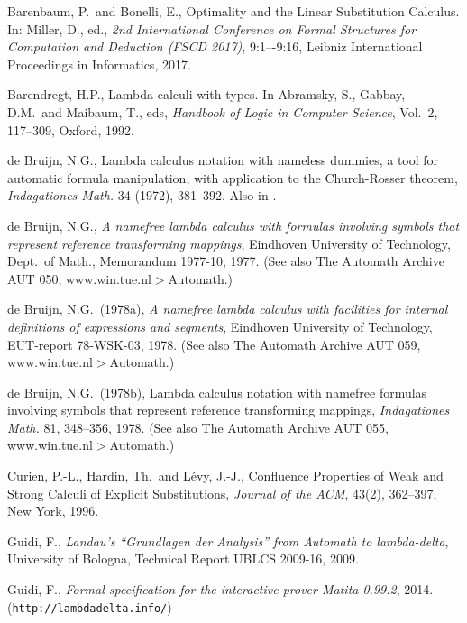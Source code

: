 \documentclass{article}
\theoremstyle{plain}
\theoremstyle{definition}
\begin{document}
{\begin{thebibliography}{8}
Barenbaum, P.\ and Bonelli, E., Optimality and the Linear Substitution Calculus. In: Miller, D., ed., {\em 2nd International Conference on Formal Structures for Computation and Deduction (FSCD 2017\/)}, 9:1–-9:16,
Leibniz International Proceedings in Informatics, 2017.

Barendregt, H.P., Lambda calculi with types. In Abramsky, S., Gabbay, D.M.\ and Maibaum, T., eds, {\em Handbook of Logic in Computer Science\/}, Vol.\ 2, 117--309, Oxford, 1992.

de Bruijn, N.G., Lambda calculus notation with nameless dummies, a tool for automatic formula manipulation, with application to the Church-Rosser theorem, {\em Indagationes Math.\/} 34 (1972), 381--392. Also in \cite{NedGeuDeV}.

de Bruijn, N.G., {\em A namefree lambda calculus with formulas involving symbols that represent reference transforming mappings\/}, Eindhoven University of Technology, Dept.\ of Math., Memorandum 1977-10, 1977. (See also The Automath Archive AUT 050,
www.win.tue.nl$>$Automath.)

de Bruijn, N.G.\ (1978a), {\em A namefree lambda calculus with facilities for internal definitions of expressions and segments\/}, Eindhoven University of Technology, EUT-report 78-WSK-03, 1978. (See also The Automath Archive AUT 059,
www.win.tue.nl$>$Automath.)

de Bruijn, N.G.\ (1978b), Lambda calculus notation with namefree formulas involving symbols that represent reference transforming mappings, {\em Indagationes Math.\/} 81, 348--356, 1978. (See also The Automath Archive AUT 055, www.win.tue.nl$>$Automath.)

Curien, P.-L., Hardin, Th.\ and L\'evy, J.-J., Confluence Properties of Weak and Strong Calculi of Explicit Substitutions, {\em Journal of the ACM\/}, 43(2), 362--397, New York, 1996.

Guidi, F., {\em Landau's ``Grundlagen der Analysis'' from Automath to lambda-delta\/}, University of Bologna, Technical Report UBLCS 2009-16, 2009.

Guidi, F., {\em Formal specification for the interactive prover Matita 0.99.2}, 2014. ({\tt http://lambdadelta.info/})


\end{thebibliography}}
\end{document}
